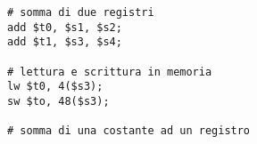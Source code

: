 \documentclass[varwidth]{standalone}
\begin{document}
\begin{verbatim}
# somma di due registri
add $t0, $s1, $s2;
add $t1, $s3, $s4;

# lettura e scrittura in memoria
lw $t0, 4($s3);
sw $to, 48($s3);

# somma di una costante ad un registro
\end{verbatim}
\end{document}
